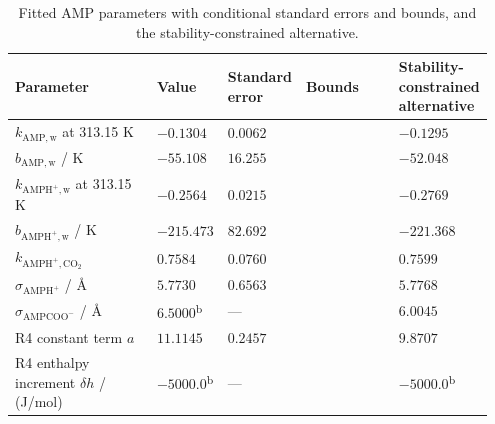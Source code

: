 \begin{table}[htbp]\small\setlength{\tabcolsep}{2pt}\caption{Fitted AMP parameters with conditional standard errors and bounds, and the stability-constrained alternative.}\label{tab:p2-amp-fitted-current}
\begin{tabular}{@{}>{\raggedright\arraybackslash}p{0.33\linewidth}>{\raggedright\arraybackslash}p{0.13\linewidth}>{\raggedright\arraybackslash}p{0.13\linewidth}>{\raggedright\arraybackslash}p{0.21\linewidth}>{\raggedright\arraybackslash}p{0.15\linewidth}@{}}
\toprule Parameter & Value & Standard error & Bounds & Stability-constrained alternative \\ \midrule
$k_{\mathrm{AMP,w}}$ at 313.15 K & $-0.1304$ & $0.0062$ & [$-0.5000$, $0.5000$] & $-0.1295$ \\
$b_{\mathrm{AMP,w}}$ / K & $-55.108$ & $16.255$ & [$-1000.000$, $1000.000$] & $-52.048$ \\
$k_{\mathrm{AMPH^+,w}}$ at 313.15 K & $-0.2564$ & $0.0215$ & [$-0.5000$, $0.5000$] & $-0.2769$ \\
$b_{\mathrm{AMPH^+,w}}$ / K & $-215.473$ & $82.692$ & [$-1000.000$, $1000.000$] & $-221.368$ \\
$k_{\mathrm{AMPH^+,CO_2}}$ & $0.7584$ & $0.0760$ & [$-1.0000$, $1.0000$] & $0.7599$ \\
$\sigma_{\mathrm{AMPH^+}}$ / \AA & $5.7730$ & $0.6563$ & [$4.5000$, $6.5000$] & $5.7768$ \\
$\sigma_{\mathrm{AMPCOO^-}}$ / \AA & $6.5000$\textsuperscript{b} & --- & [$5.3480$, $6.5000$] & $6.0045$ \\
R4 constant term $a$ & $11.1145$ & $0.2457$ & [$6.6346$, $11.6346$] & $9.8707$ \\
R4 enthalpy increment $\delta h$ / (J/mol) & $-5000.0$\textsuperscript{b} & --- & [$-5000.0$, $5000.0$] & $-5000.0$\textsuperscript{b} \\
\bottomrule\end{tabular}
\par{}\end{table}
